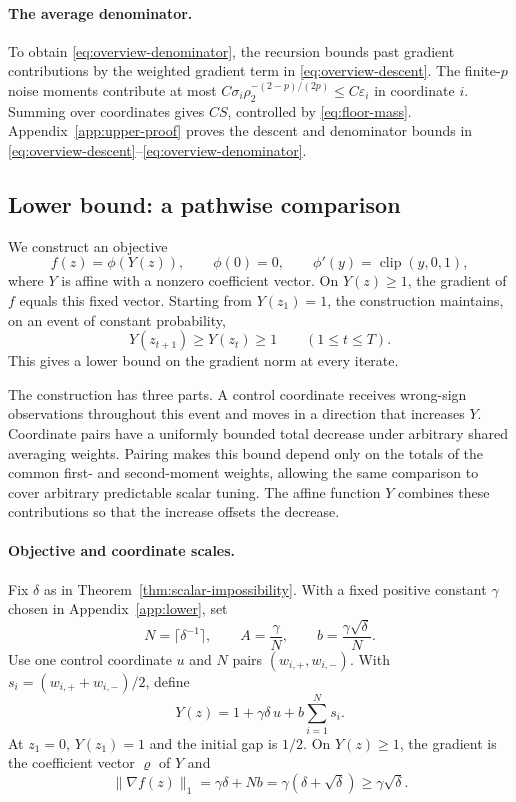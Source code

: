 \documentclass[11pt,letterpaper]{article}
\theoremstyle{definition}
\newcommand{\eps}{\varepsilon}
\newcommand{\grad}{\nabla}
\newcommand{\clip}{\operatorname{clip}}
\begin{document}
\paragraph{The average denominator.}
To obtain \eqref{eq:overview-denominator}, the recursion bounds past
gradient contributions by the weighted gradient term in
\eqref{eq:overview-descent}.
The finite-$p$ noise moments contribute at most
$C\sigma_i\rho_2^{-(2-p)/(2p)}\le C\eps_i$ in coordinate $i$.
Summing over coordinates gives $CS$, controlled by
\eqref{eq:floor-mass}. Appendix~\ref{app:upper-proof} proves the descent and
denominator bounds in \eqref{eq:overview-descent}--\eqref{eq:overview-denominator}.

\subsection{Lower bound: a pathwise comparison}

We construct an objective
\[
f(z)=\phi(Y(z)),\qquad \phi(0)=0,\qquad \phi'(y)=\clip(y,0,1),
\]
where $Y$ is affine with a nonzero coefficient vector. On $Y(z)\ge1$,
the gradient of $f$ equals this fixed vector. Starting from $Y(z_1)=1$,
the construction maintains, on an event of constant probability,
\[
Y(z_{t+1})\ge Y(z_t)\ge1\qquad(1\le t\le T).
\]
This gives a lower bound on the gradient norm at every iterate.

The construction has three parts. A control coordinate receives
wrong-sign observations throughout this event and moves in a direction
that increases $Y$. Coordinate pairs have a uniformly bounded total
decrease under arbitrary shared averaging weights. Pairing makes this
bound depend only on the totals of the common first- and second-moment
weights, allowing the same comparison to cover arbitrary predictable
scalar tuning. The affine function $Y$ combines these contributions so
that the increase offsets the decrease.

\paragraph{Objective and coordinate scales.}
Fix $\delta$ as in Theorem~\ref{thm:scalar-impossibility}. With a fixed
positive constant $\gamma$ chosen in Appendix~\ref{app:lower}, set
\[
N=\lceil\delta^{-1}\rceil,
\qquad A=\frac{\gamma}{N},\qquad b=\frac{\gamma\sqrt\delta}{N}.
\]
Use one control coordinate $u$ and $N$ pairs $(w_{i,+},w_{i,-})$. With $s_i=(w_{i,+}+w_{i,-})/2$, define
\[
Y(z)=1+\gamma\delta\,u+b\sum_{i=1}^Ns_i.
\]
At $z_1=0$, $Y(z_1)=1$ and the initial gap is $1/2$.
On $Y(z)\ge1$, the gradient is the coefficient vector $\varrho$ of $Y$ and
\[
\|\grad f(z)\|_1=\gamma\delta+Nb
=\gamma(\delta+\sqrt\delta)\ge\gamma\sqrt\delta.
\]
\end{document}
